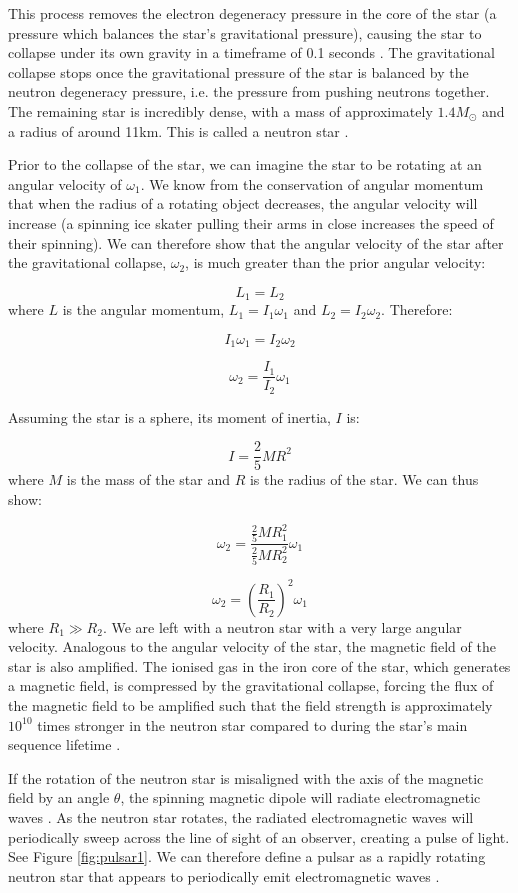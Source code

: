 \documentclass{article}
\begin{document}
This process removes the electron degeneracy pressure in the core of the star (a pressure which balances the star's gravitational pressure), causing the star to collapse under its own gravity in a timeframe of 0.1 seconds \autocite{maoz}. The gravitational collapse stops once the gravitational pressure of the star is balanced by the neutron degeneracy pressure, i.e. the pressure from pushing neutrons together. The remaining star is incredibly dense, with a mass of approximately $1.4M_{\odot}$ and a radius of around 11km. This is called a neutron star \autocite{maoz}.

Prior to the collapse of the star, we can imagine the star to be rotating at an angular velocity of $\omega_1$. We know from the conservation of angular momentum that when the radius of a rotating object decreases, the angular velocity will increase (a spinning ice skater pulling their arms in close increases the speed of their spinning). We can therefore show that the angular velocity of the star after the gravitational collapse, $\omega_2$, is much greater than the prior angular velocity:

$$L_1 = L_2$$ where $L$ is the angular momentum, $L_1=I_1\omega_1$ and $L_2=I_2\omega_2$. Therefore:

$$ I_1 \omega_1 = I_2 \omega_2 $$

$$\omega_2 = \frac{I_1}{I_2}\omega_1$$

Assuming the star is a sphere, its moment of inertia, $I$ is:

$$I = \frac{2}{5}MR^2$$ where $M$ is the mass of the star and $R$ is the radius of the star. We can thus show:

$$\omega_2 = \frac{\frac{2}{5}MR_1^2}{\frac{2}{5}MR_2^2}\omega_1$$

$$\omega_2 = \left(\frac{R_1}{R_2}\right)^2\omega_1$$ where $R_1 \gg R_2$. We are left with a neutron star with a very large angular velocity. Analogous to the angular velocity of the star, the magnetic field of the star is also amplified. The ionised gas in the iron core of the star, which generates a magnetic field, is compressed by the gravitational collapse, forcing the flux of the magnetic field to be amplified such that the field strength is approximately $10^{10}$ times stronger in the neutron star compared to during the star's main sequence lifetime \autocite{maoz}.

If the rotation of the neutron star is misaligned with the axis of the magnetic field by an angle $\theta$, the spinning magnetic dipole will radiate electromagnetic waves \autocite{maoz}. As the neutron star rotates, the radiated electromagnetic waves will periodically sweep across the line of sight of an observer, creating a pulse of light. See Figure \ref{fig:pulsar1}. We can therefore define a pulsar as a rapidly rotating neutron star that appears to periodically emit electromagnetic waves \autocite{maoz,lorimer,swainston}.
\end{document}
